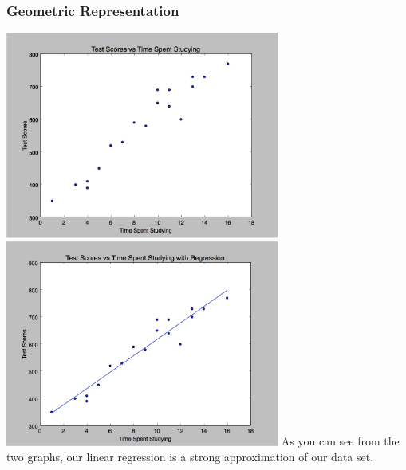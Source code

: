 \documentclass[12pt]{article}
\begin{document}
\subsubsection{Geometric Representation}
\includegraphics[width=90mm]{img/scatter_plots}
\includegraphics[width=90mm]{img/regression}
As you can see from the two graphs, our linear regression is a strong approximation of our data set. 
\end{document}
